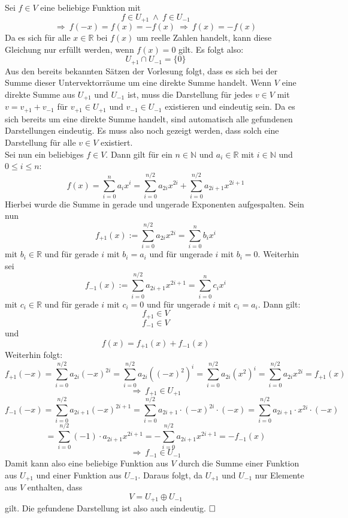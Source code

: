 \documentclass[10pt, a4paper]{article}
\begin{document}
		Sei $f \in V$ eine beliebige Funktion mit
		\[
			f \in U_{+1} \ \wedge \ f \in U_{-1}
		\]
		\[
			\Rightarrow \ f(-x) = f(x) = -f(x) \ \Rightarrow \ f(x) = -f(x)	
		\]
		Da es sich für alle $x \in \mathbb{R}$ bei $f(x)$ um reelle Zahlen handelt, kann diese Gleichung nur erfüllt werden, wenn $f(x) = 0$ gilt.
		Es folgt also:
		\[
		 	U_{+1} \cap U_{-1} = \{0\}	
		\]
		Aus den bereits bekannten Sätzen der Vorlesung folgt, dass es sich bei der Summe dieser Untervektorräume um eine direkte Summe handelt.
		Wenn $V$ eine direkte Summe aus $U_{+1}$ und $U_{-1}$ ist, muss die Darstellung für jedes $v \in V$ mit $v = v_{+1} + v_{-1}$ für $v_{+1} \in U_{+1}$ und $v_{-1} \in U_{-1}$ existieren und eindeutig sein. 
		Da es sich bereits um eine direkte Summe handelt, sind automatisch alle gefundenen Darstellungen eindeutig. Es muss also noch gezeigt werden, dass solch eine Darstellung für alle $v \in V$ existiert.\\

		Sei nun ein beliebiges $f \in V$. Dann gilt für ein $n \in \mathbb{N}$ und $a_i \in \mathbb{R}$ mit $i \in \mathbb{N}$ und $0\leq i \leq n$:
		\[
			f(x) = \sum_{i=0}^n a_ix^i = \sum_{i=0}^{n/2} a_{2i}x^{2i} + \sum_{i=0}^{n/2} a_{2i+1}x^{2i+1}
		\]
		Hierbei wurde die Summe in gerade und ungerade Exponenten aufgespalten. Sein nun
		\[
			f_{+1}(x) := \sum_{i=0}^{n/2} a_{2i}x^{2i} = \sum_{i=0}^n b_ix^{i}
		\]
		mit $b_i \in \mathbb{R}$ und für gerade $i$ mit $b_i = a_i$ und für ungerade $i$ mit $b_i = 0$. Weiterhin sei
		\[
			f_{-1}(x) := \sum_{i=0}^{n/2} a_{2i+1}x^{2i+1} = \sum_{i=0}^n c_ix^{i}
		\]
		mit $c_i \in \mathbb{R}$ und für gerade $i$ mit $c_i = 0$ und für ungerade $i$ mit $c_i = a_i$.
		Dann gilt:
		\[
			f_{+1} \in V 
		\]
		\[
			f_{-1} \in V
		\]
		und
		\[
			f(x) = f_{+1}(x) + f_{-1}(x)
		\]
		Weiterhin folgt:
		\[
			f_{+1}(-x) = \sum_{i=0}^{n/2} a_{2i}(-x)^{2i} = \sum_{i=0}^{n/2} a_{2i}\left({(-x)^2}\right)^i = \sum_{i=0}^{n/2} a_{2i}\left(x^2\right)^i = \sum_{i=0}^{n/2} a_{2i}x^{2i} = f_{+1}(x)
		\]
		\[
			\Rightarrow \ f_{+1} \in U_{+1}
		\]
		\[
			f_{-1}(-x) = \sum_{i=0}^{n/2} a_{2i+1}(-x)^{2i+1} = \sum_{i=0}^{n/2} a_{2i+1}\cdot (-x)^{2i}\cdot (-x) = \sum_{i=0}^{n/2} a_{2i+1}\cdot x^{2i}\cdot (-x)   
		\]
		\[
			= \sum_{i=0}^{n/2} (-1)\cdot a_{2i+1}x^{2i+1} = -\sum_{i=0}^{n/2} a_{2i+1}x^{2i+1} = -f_{-1}(x) 
		\]
		\[
			\Rightarrow \ f_{-1} \in U_{-1}
		\]
		Damit kann also eine beliebige Funktion aus $V$ durch die Summe einer Funktion aus $U_{+1}$ und einer Funktion aus $U_{-1}$. Daraus folgt, da $U_{+1}$ und $U_{-1}$ nur Elemente aus $V$ enthalten, dass
		\[
			V = U_{+1} \oplus U_{-1}
		\]
		gilt. Die gefundene Darstellung ist also auch eindeutig. $\hfill\Box$
\end{document}
